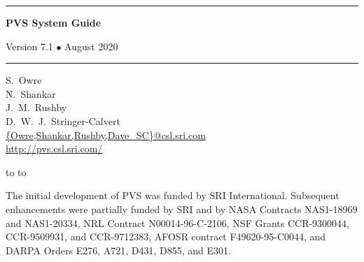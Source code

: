 \documentclass[12pt]{book}
\begin{document}
\begin{titlepage}
\vspace*{1in}
\noindent
\rule[1pt]{\textwidth}{2pt}
\begin{center}
\textbf{\pvstitle PVS System Guide}
\end{center}
\begin{flushright}
{\Large Version 7.1 {\smaller$\bullet$} August 2020}
\end{flushright}
\rule[1in]{\textwidth}{2pt}
\vspace*{2in}
\begin{flushleft}
S.~Owre\\
N.~Shankar\\
J.~M.~Rushby\\
D.~W.~J.~Stringer-Calvert\\
{\smaller\url{{Owre,Shankar,Rushby,Dave_SC}@csl.sri.com}}\\
{\smaller\url{http://pvs.csl.sri.com/}}
\end{flushleft}
\vspace*{1in}
\vbox{\hbox to %
\hbox to }
\end{titlepage}

\pagestyle{fancy}
\renewcommand{\chaptermark}[1]
  {\markboth{\thechapter\quad\em #1}{\thechapter\quad\em #1}}
\renewcommand{\sectionmark}[1]
  {\markboth{\thesection\quad\em #1}{\thesection\quad\em #1}}
\lhead[\thepage]{\rightmark}
\cfoot{}
\rhead[\leftmark]{\thepage}
\thispagestyle{empty}

\newpage
\vspace*{6in}\noindent
The initial development of PVS was funded by SRI International.
Subsequent enhancements were partially funded by SRI and by NASA
Contracts NAS1-18969 and NAS1-20334, NRL Contract N00014-96-C-2106,
NSF Grants CCR-9300044, CCR-9509931, and CCR-9712383, AFOSR contract
F49620-95-C0044, and DARPA Orders E276, A721, D431, D855, and E301.
\newpage\setcounter{page}{1}

\tableofcontents


\end{document}
